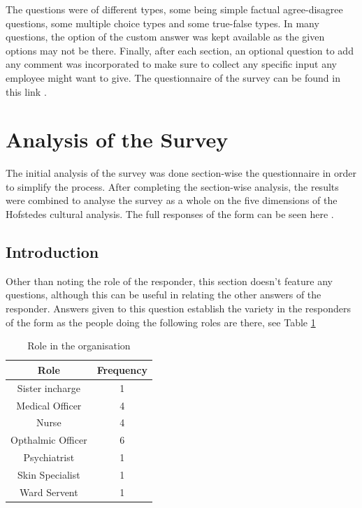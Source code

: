 \documentclass{article}
\begin{document}
The questions were of different types, some being simple factual agree-disagree questions, some multiple choice types and some true-false types. In many questions, the option of the custom answer was kept available as the given options may not be there. Finally, after each section, an optional question to add any comment was incorporated to make sure to collect any specific input any employee might want to give. The questionnaire of the survey can be found in this link \cite{ref: Survey Form}.

\section{Analysis of the Survey}

The initial analysis of the survey was done section-wise the questionnaire in order to simplify the process. After completing the section-wise analysis, the results were combined to analyse the survey as a whole on the five dimensions of the Hofstedes cultural analysis. The full responses of the form can be seen here \cite{ref:Survey Results}.

\subsection{Introduction}

Other than noting the role of the responder, this section doesn't feature any questions, although this can be useful in relating the other answers of the responder. Answers given to this question establish the variety in the responders of the form as the people doing the following roles are there, see Table \ref{responder}

\begin{table}[H]
    \begin{center}
        \begin{tabular}{|c|c|}
            \hline
            Role & Frequency\\
            \hline
            Sister incharge & 1\\
            Medical Officer & 4\\
            Nurse & 4\\
            Opthalmic Officer & 6\\
            Psychiatrist & 1\\
            Skin Specialist & 1\\
            Ward Servent & 1\\
            \hline
        \end{tabular}
        \caption{Role in the organisation}
        \label{responder}
    \end{center}
\end{table}
\end{document}
